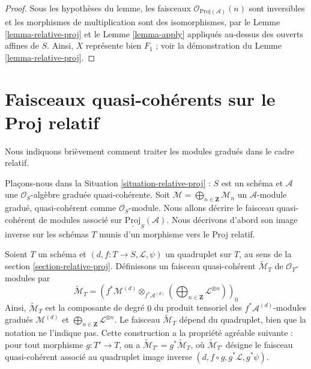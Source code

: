 \begin{proof}
Sous les hypothèses du lemme, les faisceaux
$\mathcal{O}_{\underline{\text{Proj}}(\mathcal{A})}(n)$ sont inversibles
et les morphismes de multiplication sont des isomorphismes, par le
Lemme \ref{lemma-relative-proj} et le Lemme \ref{lemma-apply} appliqués
au-dessus des ouverts affines de $S$.
Ainsi, $X$ représente bien $F_1$ ;
voir la démonstration du Lemme \ref{lemma-relative-proj}.
\end{proof}












\section{Faisceaux quasi-cohérents sur le Proj relatif}
\label{section-quasi-coherent-relative-proj}

\noindent
Nous indiquons brièvement comment traiter les modules gradués dans le cadre
relatif.

\medskip\noindent
Plaçons-nous dans la Situation \ref{situation-relative-proj} : $S$ est un
schéma et $\mathcal{A}$ une
$\mathcal{O}_S$-algèbre graduée quasi-cohérente.
Soit $\mathcal{M} = \bigoplus_{n \in \mathbf{Z}} \mathcal{M}_n$ un
$\mathcal{A}$-module gradué, quasi-cohérent comme $\mathcal{O}_S$-module.
Nous allons décrire le faisceau quasi-cohérent de modules associé sur
$\underline{\text{Proj}}_S(\mathcal{A})$.
Nous décrivons d'abord son image
inverse sur les schémas $T$ munis d'un morphisme vers le Proj relatif.

\medskip\noindent
Soient $T$ un schéma et $(d, f : T \to S, \mathcal{L}, \psi)$ un quadruplet
sur $T$, au sens de la section \ref{section-relative-proj}.
Définissons un faisceau quasi-cohérent $\widetilde{\mathcal{M}}_T$ de
$\mathcal{O}_T$-modules par
\begin{equation}
\label{equation-widetilde-M}
\widetilde{\mathcal{M}}_T =
\left(
f^*\mathcal{M}^{(d)}
\otimes_{f^*\mathcal{A}^{(d)}}
\left(\bigoplus\nolimits_{n \in \mathbf{Z}} \mathcal{L}^{\otimes n}\right)
\right)_0
\end{equation}
Ainsi, $\widetilde{\mathcal{M}}_T$ est
la composante de degré $0$ du produit
tensoriel des $f^*\mathcal{A}^{(d)}$-modules gradués
$\mathcal{M}^{(d)}$ et
$\bigoplus\nolimits_{n \in \mathbf{Z}} \mathcal{L}^{\otimes n}$.
Le faisceau $\widetilde{\mathcal{M}}_T$ dépend du
quadruplet, bien que la notation ne l'indique pas.
Cette construction a la propriété agréable suivante : pour tout morphisme
$g : T' \to T$, on a
$\widetilde{\mathcal{M}}_{T'} = g^*\widetilde{\mathcal{M}}_T$,
où $\widetilde{\mathcal{M}}_{T'}$ désigne
le faisceau quasi-cohérent associé
au quadruplet image inverse $(d, f \circ g, g^*\mathcal{L}, g^*\psi)$.

